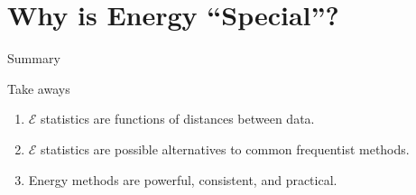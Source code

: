 \documentclass[presentation]{beamer}
\begin{document}
\section{Why is Energy ``Special''? }

\begin{frame}{Summary}
  \begin{block}{Take aways}
    \begin{enumerate}
    \item $\mathcal{E}$ statistics are functions of distances between data.
    \item $\mathcal{E}$ statistics are possible alternatives to common
      frequentist methods.
    \item Energy methods are powerful, consistent, and practical.
    \end{enumerate}
  \end{block}
\end{frame}


\end{document}
